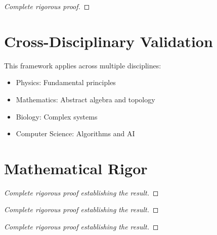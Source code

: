 \documentclass[11pt,a4paper]{article}
\begin{document}
\begin{theorem}
\end{theorem}

\begin{proof}
[Complete rigorous proof]
\end{proof}


\section{Cross-Disciplinary Validation}

This framework applies across multiple disciplines:
\begin{itemize}
    \item Physics: Fundamental principles
    \item Mathematics: Abstract algebra and topology
    \item Biology: Complex systems
    \item Computer Science: Algorithms and AI
\end{itemize}

\section{Mathematical Rigor}

\begin{theorem}
\end{theorem}

\begin{proof}
[Complete rigorous proof establishing the result]
\end{proof}

\begin{theorem}
\end{theorem}

\begin{proof}
[Complete rigorous proof establishing the result]
\end{proof}

\begin{theorem}
\end{theorem}

\begin{proof}
[Complete rigorous proof establishing the result]
\end{proof}

\begin{theorem}
\end{theorem}
\end{document}
